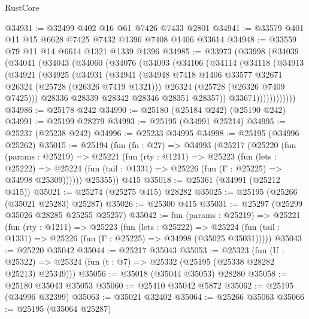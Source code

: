 \begin{lexlean}{RustCore}
\begin{coremodule}
@34931 := @32499 @402 @16 @61 @7426 @7433 @2801
@34941 := @33579 @401 @11 @15 @6628 @7425 @7432 @1396 @7408 @1406 @33614
@34948 := @33559 @79 @11 @14 @6614 @1321 @1339 @1396
@34985 := @33973
    (@33998
      (@34039
        (@34041
          (@34043
            (@34060
              (@34076
                (@34093
                  (@34106
                    (@34114
                      (@34118
                        (@34913
                          (@34921
                            (@34925
                              (@34931
                                (@34941
                                  (@34948
                                    @7418
                                    @1406
                                    @33577
                                    @32671
                                    @26324
                                    (@25728 (@26326 @7419 @1321)))
                                  @26324
                                  (@25728 (@26326 @7409 @7425)))
                                @28336
                                @28339
                                @28342
                                @28346
                                @28351
                                @28357))
                            @33671))))))))))))
@34986 := @25178 @242
@34990 := @25180 (@25184 @242) (@25190 @242)
@34991 := @25199 @28279
@34993 := @25195 (@34991 @25214)
@34995 := @25237 (@25238 @242)
@34996 := @25233 @34995
@34998 := @25195 (@34996 @25262)
@35015 := @25194
    (fun (fn : @27) =>
    @34993
      (@25217
        (@25220
          (fun (params : @25219) =>
          @25221
            (fun (rty : @1211) =>
            @25223
              (fun (lets : @25222) =>
              @25224 (fun (tail : @1331) => @25226 (fun (Γ : @25225) => @34998 @25309))))))
        @25355))
    @415
@35018 := @25361 (@34991 (@25212 @415))
@35021 := @25274 (@25275 @415) @28282
@35025 := @25195 (@25266 (@35021 @25283) @25287)
@35026 := @25300 @415
@35031 := @25297 (@25299 @35026 @28285 @25255 @25257)
@35042 := fun (params : @25219) =>
  @25221
    (fun (rty : @1211) =>
    @25223
      (fun (lets : @25222) =>
      @25224 (fun (tail : @1331) => @25226 (fun (Γ : @25225) => @34998 (@35025 @35031)))))
@35043 := @25220 @35042
@35044 := @25217 @35043
@35053 := @25323
    (fun (U : @25322) => @25324 (fun (t : @7) => @25332 (@25195 (@25338 @28282 @25213) @25349)))
@35056 := @35018 (@35044 @35053) @28280
@35058 := @25180 @35043 @35053
@35060 := @25410 @35042 @5872
@35062 := @25195 (@34996 @32399)
@35063 := @35021 @32402
@35064 := @25266 @35063
@35066 := @25195 (@35064 @25287)

\end{coremodule}
\end{lexlean}
